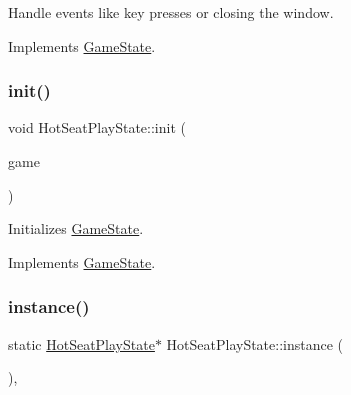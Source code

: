 Handle events like key presses or closing the window. 



Implements \mbox{\hyperlink{class_game_state_a3ef0638514dbfe71581d593cf0f66ce5}{Game\+State}}.

\mbox{\label{class_hot_seat_play_state_a2d1a6b35aac53c988e7b036d89794e70}} 
\subsubsection{\texorpdfstring{init()}{init()}}
{\footnotesize\ttfamily void Hot\+Seat\+Play\+State\+::init (\begin{DoxyParamCaption}\item[{\mbox{\hyperlink{class_game_engine}{Game\+Engine}} $\ast$}]{game }\end{DoxyParamCaption})\hspace{0.3cm}{\ttfamily [virtual]}}



Initializes \mbox{\hyperlink{class_game_state}{Game\+State}}. 



Implements \mbox{\hyperlink{class_game_state_a10b6e6bb31591c70d08ffcee5f29fa81}{Game\+State}}.

\mbox{\label{class_hot_seat_play_state_a2a0510cffde2533a6b8c9e02fa299302}} 
\subsubsection{\texorpdfstring{instance()}{instance()}}
{\footnotesize\ttfamily static \mbox{\hyperlink{class_hot_seat_play_state}{Hot\+Seat\+Play\+State}}$\ast$ Hot\+Seat\+Play\+State\+::instance (\begin{DoxyParamCaption}{ }\end{DoxyParamCaption})\hspace{0.3cm}{\ttfamily [inline]}, {\ttfamily [static]}}

\mbox{\label{class_hot_seat_play_state_af0e96c626d63f71e714bbf8119308751}} 
